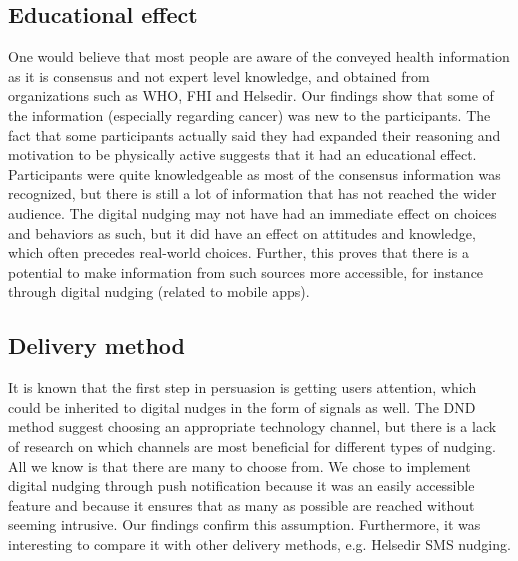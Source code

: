 \subsection{Educational effect}
One would believe that most people are aware of the conveyed health information as it is consensus and not expert level knowledge, and obtained from organizations such as WHO, FHI and Helsedir. Our findings show that some of the information (especially regarding cancer) was new to the participants. The fact that some participants actually said they had expanded their reasoning and motivation to be physically active suggests that it had an educational effect. Participants were quite knowledgeable as most of the consensus information was recognized, but there is still a lot of information that has not reached the wider audience. The digital nudging may not have had an immediate effect on choices and behaviors as such, but it did have an effect on attitudes and knowledge, which often precedes real-world choices. Further, this proves that there is a potential to make information from such sources more accessible, for instance through digital nudging (related to mobile apps). 


\subsection{Delivery method}
It is known that the first step in persuasion is getting users attention, which could be inherited to digital nudges in the form of signals as well. The DND method \cite{mirsch_making_2018} suggest choosing an appropriate technology channel, but there is a lack of research on which channels are most beneficial for different types of nudging.  All we know is that there are many to choose from. We chose to implement digital nudging through push notification because it was an easily accessible feature and because it ensures that as many as possible are reached without seeming intrusive. Our findings confirm this assumption. Furthermore, it was interesting to compare it with other delivery methods, e.g. Helsedir SMS nudging. 

